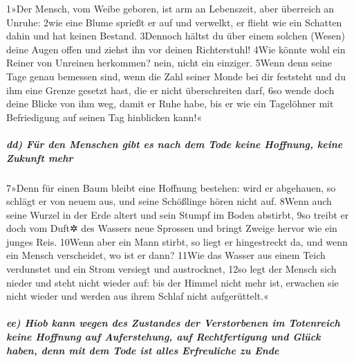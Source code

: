 1»Der Mensch, vom Weibe geboren, ist arm an Lebenszeit, aber überreich
an Unruhe: 2wie eine Blume sprießt er auf und verwelkt, er flieht wie
ein Schatten dahin und hat keinen Bestand. 3Dennoch hältst du über einem
solchen (Wesen) deine Augen offen und ziehst ihn vor deinen
Richterstuhl! 4Wie könnte wohl ein Reiner von Unreinen herkommen? nein,
nicht ein einziger. 5Wenn denn seine Tage genau bemessen sind, wenn die
Zahl seiner Monde bei dir feststeht und du ihm eine Grenze gesetzt hast,
die er nicht überschreiten darf, 6so wende doch deine Blicke von ihm
weg, damit er Ruhe habe, bis er wie ein Tagelöhner mit Befriedigung auf
seinen Tag hinblicken kann!«

\hypertarget{dd-fuxfcr-den-menschen-gibt-es-nach-dem-tode-keine-hoffnung-keine-zukunft-mehr}{%
\subparagraph{dd) Für den Menschen gibt es nach dem Tode keine Hoffnung,
keine Zukunft
mehr}\label{dd-fuxfcr-den-menschen-gibt-es-nach-dem-tode-keine-hoffnung-keine-zukunft-mehr}}

7»Denn für einen Baum bleibt eine Hoffnung bestehen: wird er abgehauen,
so schlägt er von neuem aus, und seine Schößlinge hören nicht auf. 8Wenn
auch seine Wurzel in der Erde altert und sein Stumpf im Boden abstirbt,
9so treibt er doch vom Duft✲ des Wassers neue Sprossen und bringt Zweige
hervor wie ein junges Reis. 10Wenn aber ein Mann stirbt, so liegt er
hingestreckt da, und wenn ein Mensch verscheidet, wo ist er dann? 11Wie
das Wasser aus einem Teich verdunstet und ein Strom versiegt und
austrocknet, 12so legt der Mensch sich nieder und steht nicht wieder
auf: bis der Himmel nicht mehr ist, erwachen sie nicht wieder und werden
aus ihrem Schlaf nicht aufgerüttelt.«

\hypertarget{ee-hiob-kann-wegen-des-zustandes-der-verstorbenen-im-totenreich-keine-hoffnung-auf-auferstehung-auf-rechtfertigung-und-gluxfcck-haben-denn-mit-dem-tode-ist-alles-erfreuliche-zu-ende}{%
\subparagraph{ee) Hiob kann wegen des Zustandes der Verstorbenen im
Totenreich keine Hoffnung auf Auferstehung, auf Rechtfertigung und Glück
haben, denn mit dem Tode ist alles Erfreuliche zu
Ende}\label{ee-hiob-kann-wegen-des-zustandes-der-verstorbenen-im-totenreich-keine-hoffnung-auf-auferstehung-auf-rechtfertigung-und-gluxfcck-haben-denn-mit-dem-tode-ist-alles-erfreuliche-zu-ende}}

